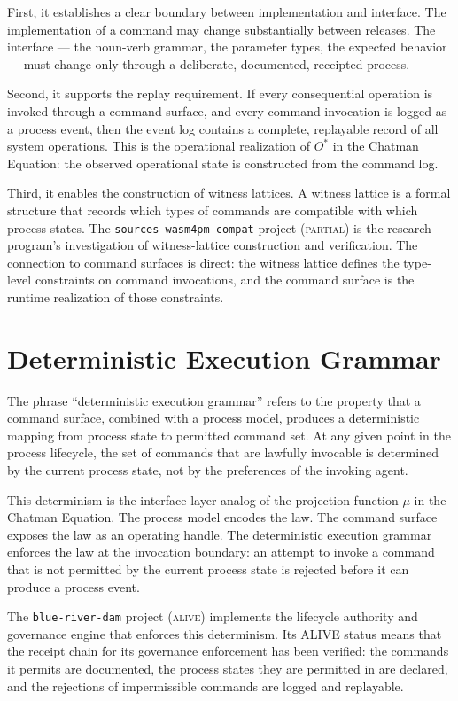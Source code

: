 First, it establishes a clear boundary between implementation and interface. The implementation of a command may change substantially between releases. The interface --- the noun-verb grammar, the parameter types, the expected behavior --- must change only through a deliberate, documented, receipted process.

Second, it supports the replay requirement. If every consequential operation is invoked through a command surface, and every command invocation is logged as a process event, then the event log contains a complete, replayable record of all system operations. This is the operational realization of $O^{*}$ in the Chatman Equation: the observed operational state is constructed from the command log.

Third, it enables the construction of witness lattices. A witness lattice is a formal structure that records which types of commands are compatible with which process states. The \texttt{sources-wasm4pm-compat} project (\textsc{partial}) is the research program's investigation of witness-lattice construction and verification. The connection to command surfaces is direct: the witness lattice defines the type-level constraints on command invocations, and the command surface is the runtime realization of those constraints.

\section{Deterministic Execution Grammar}

The phrase ``deterministic execution grammar'' refers to the property that a command surface, combined with a process model, produces a deterministic mapping from process state to permitted command set. At any given point in the process lifecycle, the set of commands that are lawfully invocable is determined by the current process state, not by the preferences of the invoking agent.

This determinism is the interface-layer analog of the projection function $\mu$ in the Chatman Equation. The process model encodes the law. The command surface exposes the law as an operating handle. The deterministic execution grammar enforces the law at the invocation boundary: an attempt to invoke a command that is not permitted by the current process state is rejected before it can produce a process event.

The \texttt{blue-river-dam} project (\textsc{alive}) implements the lifecycle authority and governance engine that enforces this determinism. Its ALIVE status means that the receipt chain for its governance enforcement has been verified: the commands it permits are documented, the process states they are permitted in are declared, and the rejections of impermissible commands are logged and replayable.

